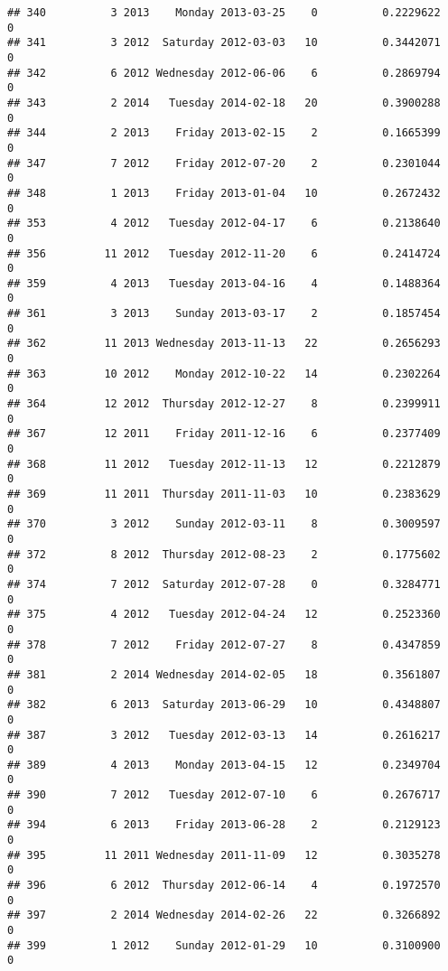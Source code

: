 \documentclass[
]{article}
\begin{document}
\begin{verbatim}
## 340          3 2013    Monday 2013-03-25    0          0.2229622             0
## 341          3 2012  Saturday 2012-03-03   10          0.3442071             0
## 342          6 2012 Wednesday 2012-06-06    6          0.2869794             0
## 343          2 2014   Tuesday 2014-02-18   20          0.3900288             0
## 344          2 2013    Friday 2013-02-15    2          0.1665399             0
## 347          7 2012    Friday 2012-07-20    2          0.2301044             0
## 348          1 2013    Friday 2013-01-04   10          0.2672432             0
## 353          4 2012   Tuesday 2012-04-17    6          0.2138640             0
## 356         11 2012   Tuesday 2012-11-20    6          0.2414724             0
## 359          4 2013   Tuesday 2013-04-16    4          0.1488364             0
## 361          3 2013    Sunday 2013-03-17    2          0.1857454             0
## 362         11 2013 Wednesday 2013-11-13   22          0.2656293             0
## 363         10 2012    Monday 2012-10-22   14          0.2302264             0
## 364         12 2012  Thursday 2012-12-27    8          0.2399911             0
## 367         12 2011    Friday 2011-12-16    6          0.2377409             0
## 368         11 2012   Tuesday 2012-11-13   12          0.2212879             0
## 369         11 2011  Thursday 2011-11-03   10          0.2383629             0
## 370          3 2012    Sunday 2012-03-11    8          0.3009597             0
## 372          8 2012  Thursday 2012-08-23    2          0.1775602             0
## 374          7 2012  Saturday 2012-07-28    0          0.3284771             0
## 375          4 2012   Tuesday 2012-04-24   12          0.2523360             0
## 378          7 2012    Friday 2012-07-27    8          0.4347859             0
## 381          2 2014 Wednesday 2014-02-05   18          0.3561807             0
## 382          6 2013  Saturday 2013-06-29   10          0.4348807             0
## 387          3 2012   Tuesday 2012-03-13   14          0.2616217             0
## 389          4 2013    Monday 2013-04-15   12          0.2349704             0
## 390          7 2012   Tuesday 2012-07-10    6          0.2676717             0
## 394          6 2013    Friday 2013-06-28    2          0.2129123             0
## 395         11 2011 Wednesday 2011-11-09   12          0.3035278             0
## 396          6 2012  Thursday 2012-06-14    4          0.1972570             0
## 397          2 2014 Wednesday 2014-02-26   22          0.3266892             0
## 399          1 2012    Sunday 2012-01-29   10          0.3100900             0

\end{verbatim}
\end{document}
